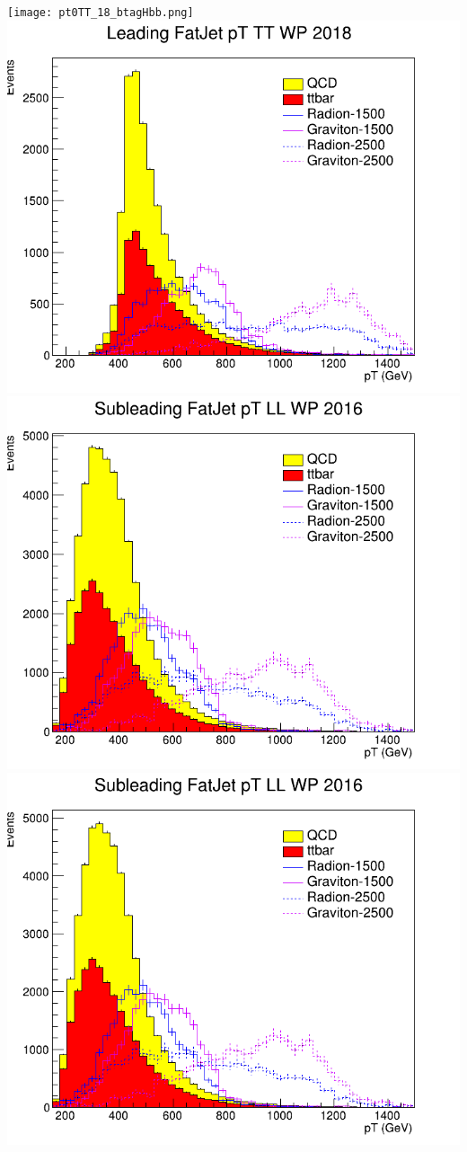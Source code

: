 \texttt{[image: pt0TT\_18\_btagHbb.png]}
\includegraphics[width=1\textwidth]{pt0TT_18_deepTagMD_HbbvsQCD.png}
\includegraphics[width=1\textwidth]{pt1LL_16_btagHbb.png}
\includegraphics[width=1\textwidth]{pt1LL_16_deepTagMD_HbbvsQCD.png}
